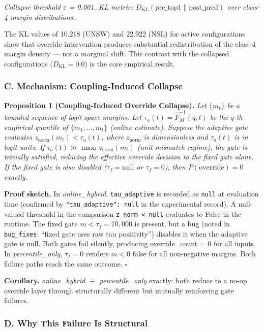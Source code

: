 \documentclass[
  conference]{IEEEtran}
\begin{document}
\emph{Collapse threshold \(\varepsilon\) = 0.001. KL metric:
\(D_{\text{KL}}(\text{pre\_top1} \| \text{post\_pred})\) over class-4
margin distributions.}

The KL values of 10.218 (UNSW) and 22.922 (NSL) for active
configurations show that override intervention produces substantial
redistribution of the class-4 margin density --- not a marginal shift.
This contrast with the collapsed configurations
(\(D_{\text{KL}} = 0.0\)) is the core empirical result.

\subsubsection{C. Mechanism: Coupling-Induced
Collapse}\label{c.-mechanism-coupling-induced-collapse}

\textbf{Proposition 1 (Coupling-Induced Override Collapse).} \emph{Let
\(\{m_t\}\) be a bounded sequence of logit-space margins. Let
\(\tau_a(t) = \hat{F}^{-1}_M(q, t)\) be the \(q\)-th empirical quantile
of \(\{m_1, \ldots, m_t\}\) (online estimate). Suppose the adaptive gate
evaluates \(z_{\text{norm}}(m_t) < \tau_a(t)\), where
\(z_{\text{norm}}\) is dimensionless and \(\tau_a(t)\) is in logit
units. If \(\tau_a(t) \gg \max_t z_{\text{norm}}(m_t)\) (unit mismatch
regime), the gate is trivially satisfied, reducing the effective
override decision to the fixed gate alone. If the fixed gate is also
disabled (\(\tau_f = \text{null}\) or \(\tau_f = 0\)), then
\(P(\text{override}) = 0\) exactly.}

\textbf{Proof sketch.} In \emph{online\_hybrid}, \texttt{tau\_adaptive}
is recorded as \texttt{null} at evaluation time (confirmed by
\texttt{"tau\_adaptive":\ null} in the experimental record). A
null-valued threshold in the comparison
\texttt{z\_norm\ \textless{}\ null} evaluates to False in the runtime.
The fixed gate \(m < \tau_f = 70{,}000\) is present, but a bug (noted in
\texttt{bug\_fixes}: ``fixed gate uses raw tau positivity'') disables it
when the adaptive gate is null. Both gates fail silently, producing
override\_count = 0 for all inputs. In \emph{percentile\_only},
\(\tau_f = 0\) renders \(m < 0\) false for all non-negative margins.
Both failure paths reach the same outcome. \(\square\)

\textbf{Corollary.} \emph{online\_hybrid} \(\equiv\)
\emph{percentile\_only} exactly: both reduce to a no-op override layer
through structurally different but mutually reinforcing gate failures.

\subsubsection{D. Why This Failure Is
Structural}\label{d.-why-this-failure-is-structural}
\end{document}
